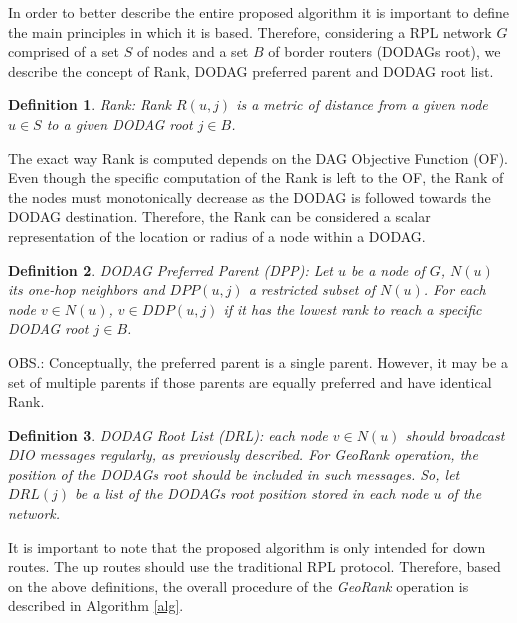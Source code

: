 \documentclass[final,authoryear,3p,twocolumn]{elsarticle}
\newtheorem{mydef}{Definition}
\begin{document}
In order to better describe the entire proposed algorithm it is important to define the main principles in which it is based. Therefore, considering a RPL network $G$ comprised of a set $S$ of nodes and a set $B$ of border routers (DODAGs root), we describe the concept of Rank, DODAG preferred parent and DODAG root list.

\begin{mydef}
Rank: Rank $R(u,j)$ is a metric of distance from a given node $u \in S$ to a given DODAG root $j \in B$.
\end{mydef}

The exact way Rank is computed depends on the DAG Objective Function (OF). Even though the specific computation of the Rank is left to the OF, the Rank of the nodes must monotonically decrease as the DODAG is followed towards the DODAG destination.  Therefore, the Rank can be considered a scalar representation of the location or radius of a node within a DODAG.

\begin{mydef}
DODAG Preferred Parent (DPP): Let $u$ be a node of $G$, $N(u)$ its one-hop neighbors and $DPP(u,j)$ a restricted subset of $N(u)$. For each node $v \in N(u)$, $v \in DDP(u,j)$ if it has the lowest rank to reach a specific DODAG root $j \in B$.
\end{mydef}

OBS.: Conceptually, the preferred parent is a single parent. However, it may be a set of multiple parents if those parents are equally preferred and have identical Rank.

\begin{mydef}
DODAG Root List (DRL): each node $v \in N(u)$ should broadcast DIO messages regularly, as previously described. For GeoRank operation, the position of the DODAGs root should be included in such messages. So, let $DRL(j)$ be a list of the DODAGs root position stored in each node $u$ of the network.
\end{mydef}

It is important to note that the proposed algorithm is only intended for down routes. The up routes should use the traditional RPL protocol. Therefore, based on the above definitions, the overall procedure of the \textit{GeoRank} operation is described in Algorithm \ref{alg}.
\end{document}
